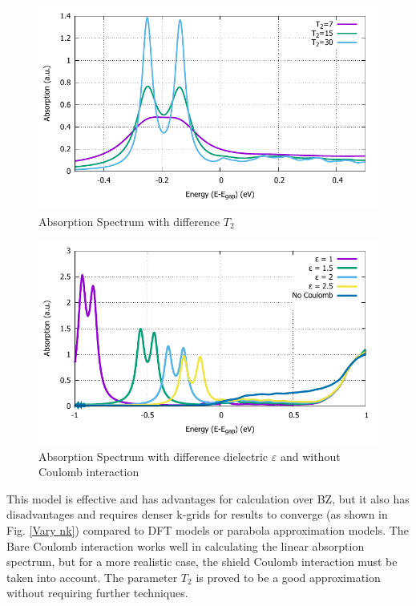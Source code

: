 \documentclass[12pt,english,a4paper]{article}
\begin{document}
\begin{figure}
	\begin{center}
		\includegraphics[width=0.75\linewidth]{images/varyT2.pdf}
		\caption[Absorption Spectrum with difference $T_2$]{Absorption Spectrum with difference $T_2$}
		\label{Vary T2}
	\end{center}
\end{figure}\null
\begin{figure}
	\begin{center}
		\includegraphics[width=0.75\linewidth]{images/varyepsilon.pdf}
		\caption[Absorption Spectrum with difference dielectric $\varepsilon$ and without Coulomb interaction]{Absorption Spectrum with difference dielectric $\varepsilon$ and without Coulomb interaction}
		\label{Vary e}
	\end{center}
\end{figure}\null
\quad This model is effective and has advantages for calculation over BZ, but it also has disadvantages and requires denser k-grids for results to converge (as shown in Fig. \ref{Vary nk}) compared to DFT models or parabola approximation models. The Bare Coulomb interaction works well in calculating the linear absorption spectrum, but for a more realistic case, the shield Coulomb interaction must be taken into account\cite{erben_excitation-induced_2018,erben_optical_2022}. The parameter $T_2$ is proved to be a good approximation without requiring further techniques.
\end{document}
